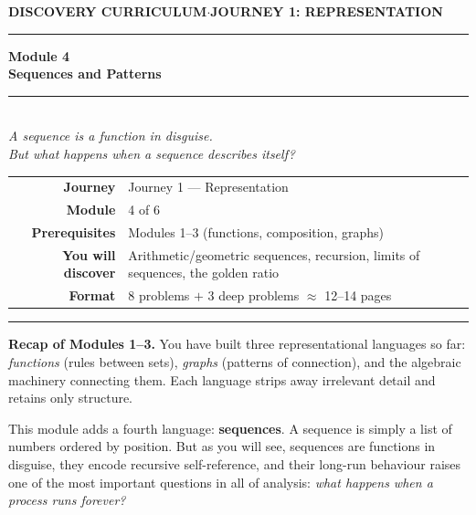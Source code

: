 \documentclass[12pt, a4paper]{article}
\newcounter{problem}
\begin{document}

\thispagestyle{empty}
\begin{center}
{\small\color{MidBlue}\textbf{DISCOVERY CURRICULUM}\quad$\cdot$\quad\textbf{JOURNEY 1: REPRESENTATION}}

\vspace{0.6cm}
{\color{NavyBlue}\rule{\linewidth}{2pt}}
\vspace{0.5cm}

{\Huge\bfseries\color{NavyBlue}Module 4}\\[0.3cm]
{\LARGE\bfseries\color{MidBlue}Sequences and Patterns}\\[0.4cm]
{\color{Gold}\rule{0.4\linewidth}{1.2pt}}\\[0.4cm]
{\large\itshape\color{DarkGrey}
A sequence is a function in disguise.\\[0.15cm]
But what happens when a sequence describes itself?}

\vspace{1cm}
\begin{tabular}{rl}
\color{DarkGrey}\textbf{Journey}           & Journey 1 --- Representation \\[4pt]
\color{DarkGrey}\textbf{Module}            & 4 of 6 \\[4pt]
\color{DarkGrey}\textbf{Prerequisites}     & Modules 1--3 (functions, composition, graphs) \\[4pt]
\color{DarkGrey}\textbf{You will discover} & Arithmetic/geometric sequences, recursion, limits of sequences, the golden ratio \\[4pt]
\color{DarkGrey}\textbf{Format}            & 8 problems $+$ 3 deep problems $\approx$ 12--14 pages \\
\end{tabular}

\vspace{1cm}
{\color{NavyBlue}\rule{\linewidth}{2pt}}
\end{center}

\vspace{0.6cm}

\noindent\textbf{Recap of Modules 1--3.}
You have built three representational languages so far: \emph{functions} (rules between sets), \emph{graphs} (patterns of connection), and the algebraic machinery connecting them. Each language strips away irrelevant detail and retains only structure.

\medskip
This module adds a fourth language: \textbf{sequences}. A sequence is simply a list of numbers ordered by position. But as you will see, sequences are functions in disguise, they encode recursive self-reference, and their long-run behaviour raises one of the most important questions in all of analysis: \emph{what happens when a process runs forever?}
\end{document}
